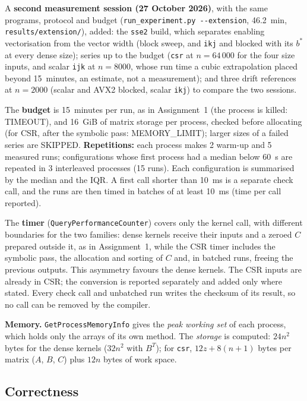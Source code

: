 \documentclass[11pt,a4paper]{article}
\begin{document}
A \textbf{second measurement session (27 October 2026)}, with the same programs, protocol
and budget (\texttt{run\_experiment.py -{}-extension}, 46.2~min, \texttt{results/extension/}),
added: the \texttt{sse2} build, which separates enabling vectorisation from the vector
width (block sweep, and \texttt{ikj} and blocked with its $b^*$ at every dense size); series
up to the budget (\texttt{csr} at $n = 64\,000$ for the four size inputs, and scalar
\texttt{ijk} at $n = 8000$, whose run time a cubic extrapolation placed beyond 15~minutes,
an estimate, not a measurement); and three
drift references at $n = 2000$ (scalar and AVX2 blocked, scalar \texttt{ikj}) to compare
the two sessions.

The \textbf{budget} is 15~minutes per run, as in Assignment~1 (the process is killed:
TIMEOUT), and 16~GiB of matrix storage per process, checked before allocating (for CSR,
after the symbolic pass: MEMORY\_LIMIT); larger sizes of a failed series are SKIPPED.
\textbf{Repetitions:} each process makes 2 warm-up and 5 measured runs; configurations whose
first process had a median below 60~s are repeated in 3 interleaved processes (15 runs).
Each configuration is summarised by the median and the IQR. A first call shorter than 10~ms
is a separate check call, and the runs are then timed in batches of at least 10~ms (time per
call reported).

The \textbf{timer} (\texttt{QueryPerformanceCounter}) covers only the kernel call, with
different boundaries for the two families: dense kernels receive their inputs and a zeroed
$C$ prepared outside it, as in Assignment~1, while the CSR timer includes the symbolic pass,
the allocation and sorting of $C$ and, in batched runs, freeing the previous outputs. This
asymmetry favours the dense kernels.
The CSR inputs are already in CSR; the conversion is reported separately and added only
where stated. Every check call and unbatched run writes the checksum of its result, so no
call can be removed by the compiler.

\textbf{Memory.} \texttt{GetProcessMemoryInfo} gives the \textit{peak working set} of each
process, which holds only the arrays of its own method. The \textit{storage} is computed:
$24n^2$ bytes for the dense kernels ($32n^2$ with $B^T$); for \texttt{csr}, $12z + 8(n+1)$
bytes per matrix ($A$, $B$, $C$) plus $12n$ bytes of work space.

\subsection{Correctness}
\end{document}
